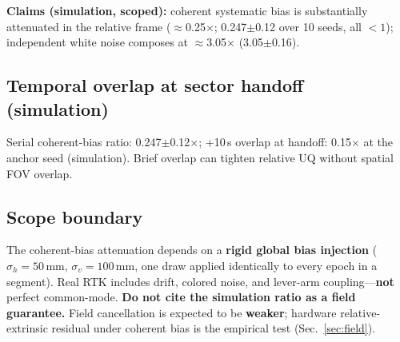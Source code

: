 \textbf{Claims (simulation, scoped):} coherent systematic bias is substantially
attenuated in the relative frame ($\approx$0.25$\times$; 0.247$\pm$0.12 over 10
seeds, all $<1$); independent white noise composes at $\approx$3.05$\times$
(3.05$\pm$0.16).

\subsection{Temporal overlap at sector handoff (simulation)}
Serial \flightW{} coherent-bias ratio: 0.247$\pm$0.12$\times$; +10\,s overlap at
handoff: 0.15$\times$ at the anchor seed (simulation).
Brief overlap can tighten relative UQ without spatial FOV overlap.

\subsection{Scope boundary}
The coherent-bias attenuation depends on a \textbf{rigid global bias injection}
($\sigma_h{=}50$\,mm, $\sigma_v{=}100$\,mm, one draw applied identically to every
epoch in a segment).
Real RTK includes drift, colored noise, and lever-arm coupling---\textbf{not} perfect
common-mode.
\textbf{Do not cite the simulation ratio as a field guarantee.}
Field cancellation is expected to be \textbf{weaker}; hardware relative-extrinsic
residual under coherent bias is the empirical test (Sec.~\ref{sec:field}).
